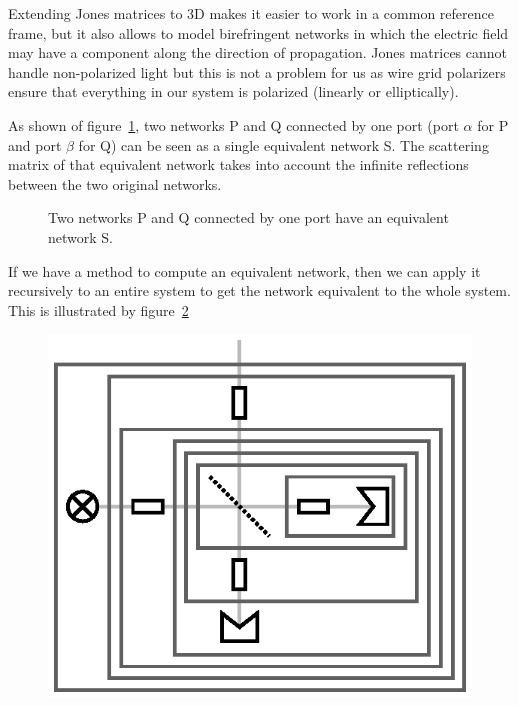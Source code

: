 \documentclass[a4paper,11pt]{article}
\begin{document}
Extending Jones matrices to 3D makes it easier to work in a common reference frame, but it also allows to model birefringent networks in which the electric field may have a component along the direction of propagation.
Jones matrices cannot handle non-polarized light but this is not a problem for us as wire grid polarizers ensure that everything in our system is polarized (linearly or elliptically).







As shown of figure~\ref{fig:cascading}, two networks P and Q connected by one port (port $\alpha$ for P and port $\beta$ for Q) can be seen as a single equivalent  network S.
The scattering matrix of that equivalent network takes into account the infinite reflections between the two original networks.
\begin{figure}[hbtp]
    \centering
    
    \caption{\label{fig:cascading}Two networks P and Q connected by one port have an equivalent network S.}
\end{figure}

If we have a method to compute an equivalent network, then we can apply it recursively to an entire system to get the network equivalent to the whole system.
This is illustrated by figure~\ref{fig:cascading_example}
\begin{figure}[hbtp]
    \centering
    \includegraphics{cascading_example}
    \caption{\label{fig:cascading_example}}
\end{figure}
\end{document}
